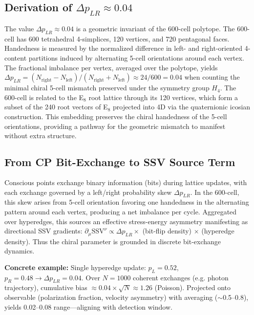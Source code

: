 \documentclass[11pt]{article}
\begin{document}
\subsection{Derivation of $\Delta p_{LR} \approx 0.04$}
The value $\Delta p_{LR} \approx 0.04$ is a geometric invariant of the 600-cell polytope. The 600-cell has 600 tetrahedral 4-simplices, 120 vertices, and 720 pentagonal faces. Handedness is measured by the normalized difference in left- and right-oriented 4-content partitions induced by alternating 5-cell orientations around each vertex. The fractional imbalance per vertex, averaged over the polytope, yields $\Delta p_{LR} = (N_\text{right} - N_\text{left}) / (N_\text{right} + N_\text{left}) \approx 24/600 = 0.04$ when counting the minimal chiral 5-cell mismatch preserved under the symmetry group $H_4$. The 600-cell is related to the E$_8$ root lattice through its 120 vertices, which form a subset of the 240 root vectors of E$_8$ projected into 4D via the quaternionic icosian construction. This embedding preserves the chiral handedness of the 5-cell orientations, providing a pathway for the geometric mismatch to manifest without extra structure.

\subsection{From CP Bit-Exchange to SSV Source Term}
Conscious points exchange binary information (bits) during lattice updates, with each exchange governed by a left/right probability skew $\Delta p_{LR}$. In the 600-cell, this skew arises from 5-cell orientation favoring one handedness in the alternating pattern around each vertex, producing a net imbalance per cycle. Aggregated over hyperedges, this sources an effective stress-energy asymmetry manifesting as directional SSV gradients: $\partial_\mu \text{SSV}^\nu \propto \Delta p_{LR} \times$ (bit-flip density) $\times$ (hyperedge density). Thus the chiral parameter is grounded in discrete bit-exchange dynamics.

\textbf{Concrete example:} Single hyperedge update: $p_L = 0.52$, $p_R = 0.48 \to \Delta p_{LR} = 0.04$. Over $N = 1000$ coherent exchanges (e.g. photon trajectory), cumulative bias $\approx 0.04 \times \sqrt{N} \approx 1.26$ (Poisson). Projected onto observable (polarization fraction, velocity asymmetry) with averaging ($\sim$0.5--0.8), yields 0.02--0.08 range—aligning with detection window.
\end{document}
